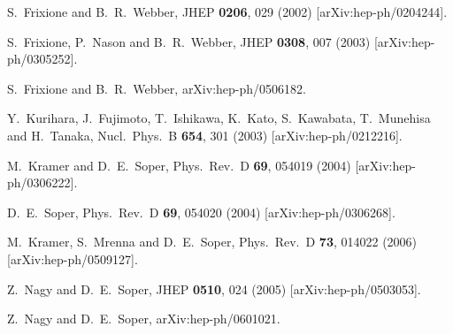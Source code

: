 \documentclass[12pt]{iopart}
\begin{document}
\begin{thebibliography}{99}
  S.~Frixione and B.~R.~Webber,
  JHEP {\bf 0206}, 029 (2002)
  [arXiv:hep-ph/0204244].


  S.~Frixione, P.~Nason and B.~R.~Webber,
  JHEP {\bf 0308}, 007 (2003)
  [arXiv:hep-ph/0305252].


  S.~Frixione and B.~R.~Webber,
  arXiv:hep-ph/0506182.


  Y.~Kurihara, J.~Fujimoto, T.~Ishikawa, K.~Kato, S.~Kawabata, T.~Munehisa and H.~Tanaka,
  Nucl.\ Phys.\ B {\bf 654}, 301 (2003)
  [arXiv:hep-ph/0212216].

  M.~Kramer and D.~E.~Soper,
  Phys.\ Rev.\ D {\bf 69}, 054019 (2004)
  [arXiv:hep-ph/0306222].


  D.~E.~Soper,
  Phys.\ Rev.\ D {\bf 69}, 054020 (2004)
  [arXiv:hep-ph/0306268].


  M.~Kramer, S.~Mrenna and D.~E.~Soper,
  Phys.\ Rev.\ D {\bf 73}, 014022 (2006)
  [arXiv:hep-ph/0509127].

  Z.~Nagy and D.~E.~Soper,
  JHEP {\bf 0510}, 024 (2005)
  [arXiv:hep-ph/0503053].

  Z.~Nagy and D.~E.~Soper,
  arXiv:hep-ph/0601021.


\end{thebibliography}
\end{document}
